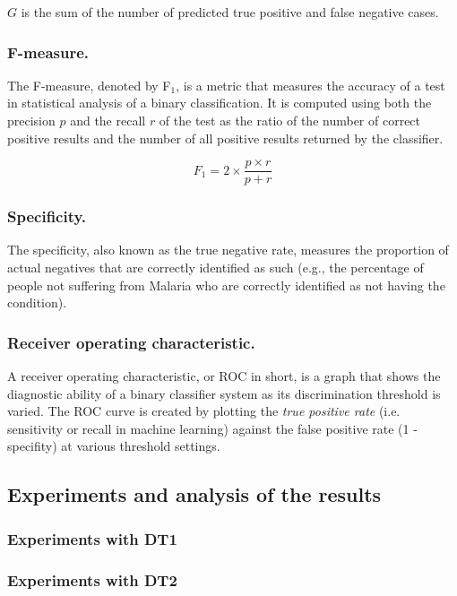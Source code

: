 $G$ is the sum of the number of predicted true positive and false negative cases.

\subsubsection{F-measure.} The F-measure, denoted by F$_1$, is a metric that measures the accuracy of a test in statistical analysis of a binary classification.
It is computed using both the precision $p$ and the recall $r$ of the test as the ratio of the number of correct positive results and the
number of all positive results returned by the classifier. 

\begin{equation}
F_1 = 2 \times \frac{p\times r}{p + r}
\label{f-measure}
\end{equation}
 
\subsubsection{Specificity.} The specificity, also known as the true negative rate, measures the proportion of actual negatives that are correctly identified as such 
(e.g., the percentage of people not suffering from Malaria  who are correctly identified as not having the condition).

\subsubsection{Receiver operating characteristic.} A receiver operating characteristic, or ROC in short, is a graph
 that shows the diagnostic ability of a binary classifier system as its discrimination threshold is varied.
The ROC curve is created by plotting the \emph{true positive rate} (i.e. sensitivity or recall in machine learning) 
against the false positive rate (1 - specifity) at various threshold settings. 

\subsection{Experiments and analysis of the results}


\subsubsection{Experiments with DT1}
\subsubsection{Experiments with DT2}


